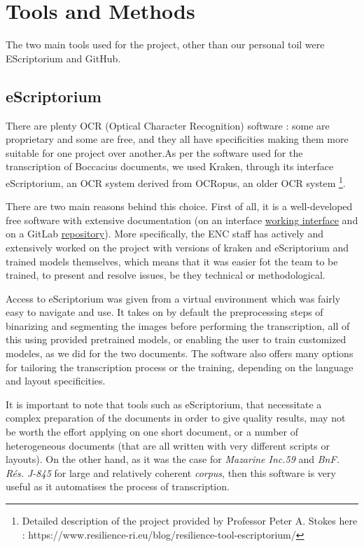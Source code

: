 \documentclass[12pt]{article}
\begin{document}
\clearpage
\section{Tools and Methods}

The two main tools used for the project, other than our personal toil were EScriptorium and GitHub.

\subsection{eScriptorium}

There are plenty OCR (Optical Character Recognition) software : some are proprietary and some are free, and they all have specificities making them more suitable for one project over another.As per the software used for the transcription of Boccacius documents, we used Kraken, through its interface eScriptorium, an OCR system derived from OCRopus, an older OCR system \footnote{Detailed description of the project provided by Professor Peter A. Stokes here : https://www.resilience-ri.eu/blog/resilience-tool-escriptorium/}.

There are two main reasons behind this choice. First of all, it is a well-developed free software with extensive documentation (on an interface \href{https://traces6.paris.inria.fr/}{working interface} and on a GitLab \href{https://gitlab.com/scripta/escriptorium/}{repository}). More specifically, the ENC staff has actively and extensively worked on the project with versions of kraken and eScriptorium and trained models themselves, which means that it was easier fot the team to be trained, to present and resolve issues, be they technical or methodological.

Access to eScriptorium was given from a virtual environment which was fairly easy to navigate and use. It takes on by default the preprocessing steps of binarizing and segmenting the images before performing the transcription, all of this using provided pretrained models, or enabling the user to train customized modeles, as we did for the two documents. The software also offers many options for tailoring the transcription process or the training, depending on the language and layout specificities. 

It is important to note that tools such as eScriptorium, that necessitate a complex preparation of the documents in order to give quality results, may not be worth the effort  applying on one short document, or a number of heterogeneous documents (that are all written with very different scripts or layouts). On the other hand, as it was the case for \textit{Mazarine Inc.59} and \textit{BnF. Rés. J-845} for large and relatively coherent \textit{corpus}, then this software is very useful as it  automatises the process of transcription.
\end{document}
